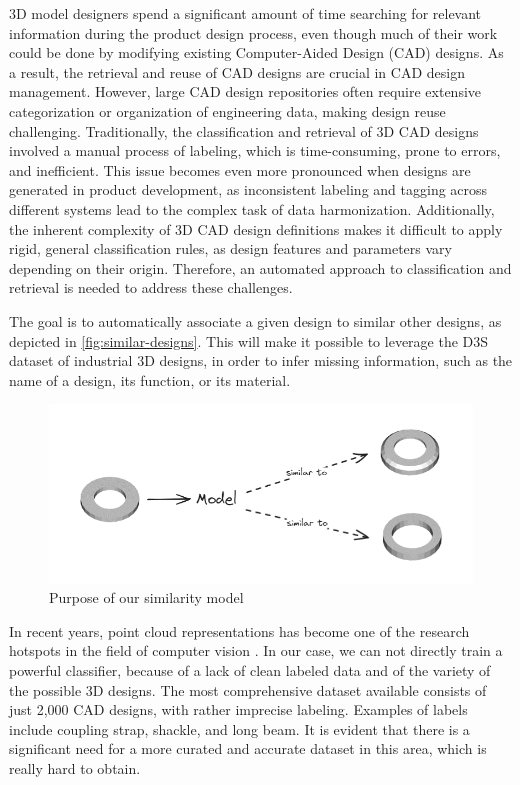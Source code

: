 3D model designers spend a significant amount of time searching for relevant information during the product design process, even though much of their work could be done by modifying existing Computer-Aided Design (CAD) designs. As a result, the retrieval and reuse of CAD designs are crucial in CAD design management. However, large CAD design repositories often require extensive categorization or organization of engineering data, making design reuse challenging. Traditionally, the classification and retrieval of 3D CAD designs involved a manual process of labeling, which is time-consuming, prone to errors, and inefficient. This issue becomes even more pronounced when designs are generated in product development, as inconsistent labeling and tagging across different systems lead to the complex task of data harmonization. Additionally, the inherent complexity of 3D CAD design definitions makes it difficult to apply rigid, general classification rules, as design features and parameters vary depending on their origin. Therefore, an automated approach to classification and retrieval is needed to address these challenges.

The goal is to automatically associate a given design to similar other designs, as depicted in \autoref{fig:similar-designs}. This will make it possible to leverage the D3S dataset of industrial 3D designs, in order to infer missing information, such as the name of a design, its function, or its material.

\begin{figure}[]
    \centering
    \includegraphics[width=0.8\columnwidth]{images/similar-pieces.png}
    \caption{Purpose of our similarity model}
    \label{fig:similar-designs}
\end{figure}

In recent years, point cloud representations has become one of the research hotspots in the field of computer vision \cite{zhangDeepLearningbased3D2023}.
In our case, we can not directly train a powerful classifier, because of a lack of clean labeled data and of the variety of the possible 3D designs.
The most comprehensive dataset available consists of just 2,000 CAD designs, with rather imprecise labeling. Examples of labels include coupling strap, shackle, and long beam. It is evident that there is a significant need for a more curated and accurate dataset in this area, which is really hard to obtain.

